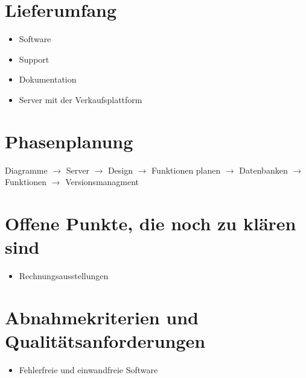 \documentclass[11pt,a4paper]{scrbook}
\begin{document}
\section*{Lieferumfang}
\begin{itemize}
\item Software
\item Support
\item Dokumentation
\item Server mit der Verkaufsplattform
\end{itemize}

\section*{Phasenplanung}

Diagramme $\longrightarrow$ Server $\longrightarrow$ Design $\longrightarrow$ Funktionen planen $\longrightarrow$ Datenbanken $\longrightarrow$ Funktionen $\longrightarrow$ Versionsmanagment


\section*{Offene Punkte, die noch zu klären sind}
\begin{itemize}
\item Rechnungsausstellungen
\end{itemize}

\section*{Abnahmekriterien und Qualitätsanforderungen}

\begin{itemize}
\item Fehlerfreie und einwandfreie Software
\end{itemize}
\end{document}
